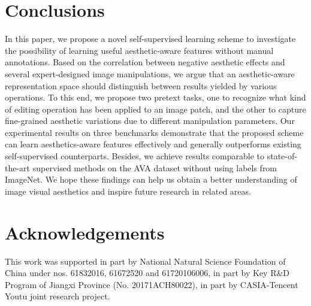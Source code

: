 \documentclass[letterpaper]{article}
\begin{document}
\section{Conclusions}
In this paper, we propose a novel self-supervised learning scheme to investigate the possibility of learning useful aesthetic-aware features without manual annotations.
Based on the correlation between negative aesthetic effects and several expert-designed image manipulations, we argue that an aesthetic-aware representation space should distinguish between results yielded by various operations.
To this end, we propose two pretext tasks, one to recognize what kind of editing operation has been applied to an image patch, and the other to capture fine-grained aesthetic variations due to different manipulation parameters.
Our experimental results on three benchmarks demonstrate that the proposed scheme can learn aesthetics-aware features effectively and generally outperforms existing self-supervised counterparts.
Besides, we achieve results comparable to state-of-the-art supervised methods on the AVA dataset without using labels from ImageNet.
We hope these findings can help us obtain a better understanding of image visual aesthetics and inspire future research in related areas.

\section*{Acknowledgements}
\footnotesize{This work was supported in part by National Natural Science Foundation of China under nos. 61832016, 61672520 and 61720106006, in part by Key R\&D Program of Jiangxi Province (No. 20171ACH80022), in part by CASIA-Tencent Youtu joint research project.}
\end{document}
